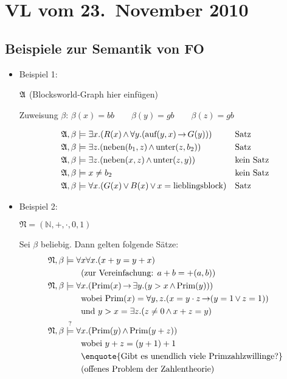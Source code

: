 \section{VL vom 23.~November 2010}

\subsection{Beispiele zur Semantik von FO}

\begin{itemize}
  \item Beispiel 1:\par
  $\mathfrak{A}$ (Blocksworld-Graph hier einfügen)
  
  Zuweisung $\beta$: $\beta(x) = bb \qquad \beta(y) = gb \qquad \beta(z) = gb$
  
  \begin{align}
    \mathfrak{A}, \beta &\models \exists x.(R(x) \operatorname{\wedge} \forall y.(\text{auf}(y,x) \operatorname{\rightarrow} G(y))) && \text{Satz} \\
    \mathfrak{A}, \beta &\models \exists z.(\text{neben}(b_1,z) \operatorname{\wedge} \text{unter}(z,b_2))     && \text{Satz} \\
    \mathfrak{A}, \beta &\models \exists z.(\text{neben}(x,z) \operatorname{\wedge} \text{unter}(z,y))         && \text{kein Satz} \\
    \mathfrak{A}, \beta &\models x \not= b_2                                                  && \text{kein Satz} \\
    \mathfrak{A}, \beta &\models \forall x.(G(x) \operatorname{\vee} B(x) \operatorname{\vee} x = \text{lieblingsblock})      && \text{Satz}
  \end{align}
  
  \item Beispiel 2:\par
  $\mathfrak{N} = (\mathbb{N}, +, \cdot, 0, 1)$
  
  Sei $\beta$ beliebig. Dann gelten folgende Sätze:
  \begin{align}
    \mathfrak{N}, \beta &\models \forall x \forall x.(x+y=y+x) \\
                        & \qquad\text{(zur Vereinfachung: $a+b = +(a,b)$)} \notag\\
    \mathfrak{N}, \beta &\models \forall x.(\text{Prim}(x) \IMPL \exists y.(y>x \AND \text{Prim}(y))) \\
                        & \qquad\text{wobei $\text{Prim}(x) = \forall y,z.(x=y\cdot z \IMPL (y=1 \OR z=1))$} \notag\\
                        & \qquad\text{und $y>x = \exists z.(z\not=0 \AND x+z = y)$} \notag\\
    \mathfrak{N}, \beta &\stackrel{?}{\models} \forall x.(\text{Prim}(y) \AND \text{Prim}(y+z)) \\
                        & \qquad\text{wobei $y+z = (y+1)+1$} \notag\\
                        & \qquad\text{\enquote{Gibt es unendlich viele Primzahlzwillinge?}}\notag\\
                        & \qquad\text{(offenes Problem der Zahlentheorie)}\notag
  \end{align}
\end{itemize}

